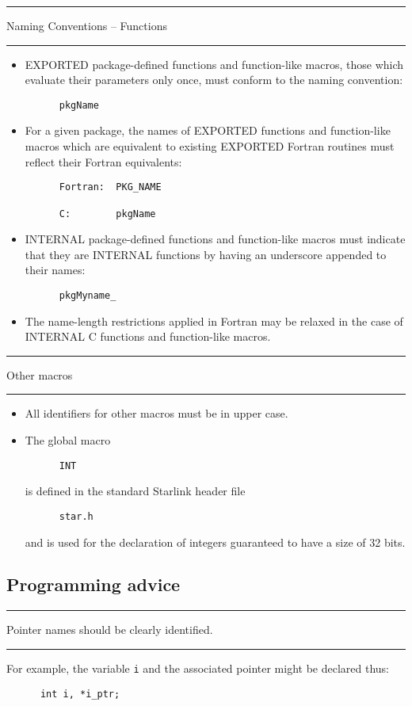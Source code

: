 \documentclass[twoside,11pt]{article}
\newcounter{sruleno}
\newcommand{\srule}[1]{
    \addtocounter{sruleno}{1}
    \goodbreak
    \rule[0.5ex]{\textwidth}{0.3mm}
    {\Large #1 \hfill {\thesruleno}}
    \rule[0.5ex]{\textwidth}{0.1mm}
}
\newcommand{\srule}[1]{
       \addtocounter{sruleno}{1}
       \begin{rawhtml} <HR> \end{rawhtml}
       {\Large \thesruleno}~~~~{\Large #1}
       \begin{rawhtml} <HR> \end{rawhtml}
       \end{tabular}
  }
\begin{document}
\srule{Naming Conventions -- Functions}
\begin{itemize}
\item EXPORTED package-defined functions and function-like macros, those which
evaluate their parameters only once, must conform to the naming convention:
\begin{verbatim}
      pkgName
\end{verbatim}
\item For a given package, the names of EXPORTED functions
and function-like macros which are
equivalent to existing EXPORTED Fortran routines must reflect their
Fortran equivalents:
\begin{verbatim}
      Fortran:  PKG_NAME

      C:        pkgName
\end{verbatim}
\item INTERNAL package-defined functions and function-like macros
must indicate that they are INTERNAL
functions by having an underscore appended to their names:
\begin{verbatim}
      pkgMyname_
\end{verbatim}
\item The name-length restrictions applied in Fortran may be relaxed in the
case of INTERNAL C functions and function-like macros.
\end{itemize}

\srule{Other macros}
\begin{itemize}
\item All identifiers for other macros must be in upper case.
\item The global macro
\begin{verbatim}
      INT
\end{verbatim}
is defined in the standard Starlink header file
\begin{verbatim}
      star.h
\end{verbatim}
and is used for the declaration of integers guaranteed to have a size of
32 bits.
\end{itemize}

\subsection{Programming advice}

\srule{Pointer names should be clearly identified.}
For example, the variable {\tt i} and the associated pointer
might be declared thus:
\begin{verbatim}
      int i, *i_ptr;
\end{verbatim}
\end{document}
